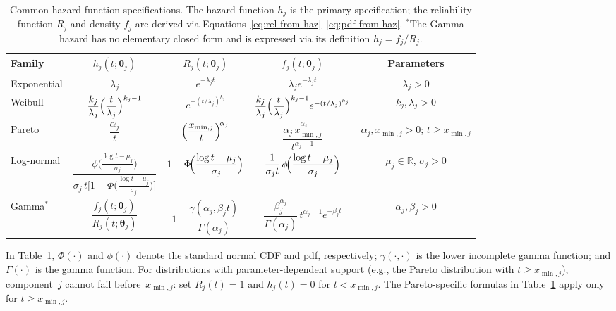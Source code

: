 \documentclass[11pt]{article}
\theoremstyle{definition}
\theoremstyle{plain}
\renewcommand{\v}[1]{\boldsymbol{#1}}
\begin{document}
\begin{table}[ht]
\centering
\caption{Common hazard function specifications.
The hazard function $h_j$ is the primary specification; the reliability
function $R_j$ and density $f_j$ are derived via
Equations~\eqref{eq:rel-from-haz}--\eqref{eq:pdf-from-haz}.
$^*$The Gamma hazard has no elementary closed form and is expressed
via its definition $h_j = f_j / R_j$.}
\label{tab:distributions}
\footnotesize
\renewcommand{\arraystretch}{1.6}
\begin{tabular}{@{}lcccc@{}}
\toprule
\textbf{Family} & $h_j(t; \v{\theta}_j)$ & $R_j(t; \v{\theta}_j)$
    & $f_j(t; \v{\theta}_j)$ & \textbf{Parameters} \\
\midrule
Exponential
    & $\lambda_j$
    & $e^{-\lambda_j t}$
    & $\lambda_j e^{-\lambda_j t}$
    & $\lambda_j > 0$ \\
Weibull
    & $\dfrac{k_j}{\lambda_j}\Bigl(\dfrac{t}{\lambda_j}\Bigr)^{k_j - 1}$
    & $e^{-(t/\lambda_j)^{k_j}}$
    & $\dfrac{k_j}{\lambda_j}\Bigl(\dfrac{t}{\lambda_j}\Bigr)^{k_j - 1}
        e^{-(t/\lambda_j)^{k_j}}$
    & $k_j, \lambda_j > 0$ \\
Pareto
    & $\dfrac{\alpha_j}{t}$
    & $\Bigl(\dfrac{x_{\min,j}}{t}\Bigr)^{\!\alpha_j}$
    & $\dfrac{\alpha_j \, x_{\min,j}^{\alpha_j}}{t^{\alpha_j + 1}}$
    & $\alpha_j, x_{\min,j} > 0$; $t \geq x_{\min,j}$ \\
Log-normal
    & $\dfrac{\phi\bigl(\frac{\log t - \mu_j}{\sigma_j}\bigr)}
        {\sigma_j \, t \bigl[1 - \Phi\bigl(\frac{\log t - \mu_j}{\sigma_j}\bigr)\bigr]}$
    & $1 - \Phi\!\Bigl(\dfrac{\log t - \mu_j}{\sigma_j}\Bigr)$
    & $\dfrac{1}{\sigma_j t}\,
        \phi\!\Bigl(\dfrac{\log t - \mu_j}{\sigma_j}\Bigr)$
    & $\mu_j \in \mathbb{R}$, $\sigma_j > 0$ \\
Gamma$^*$
    & $\dfrac{f_j(t; \v{\theta}_j)}{R_j(t; \v{\theta}_j)}$
    & $1 - \dfrac{\gamma(\alpha_j, \beta_j t)}{\Gamma(\alpha_j)}$
    & $\dfrac{\beta_j^{\alpha_j}}{\Gamma(\alpha_j)} \,
        t^{\alpha_j - 1} e^{-\beta_j t}$
    & $\alpha_j, \beta_j > 0$ \\
\bottomrule
\end{tabular}
\end{table}

In Table~\ref{tab:distributions}, $\Phi(\cdot)$ and $\phi(\cdot)$ denote
the standard normal CDF and pdf, respectively; $\gamma(\cdot, \cdot)$ is the
lower incomplete gamma function; and $\Gamma(\cdot)$ is the gamma function.
For distributions with parameter-dependent support (e.g., the Pareto
distribution with $t \geq x_{\min,j}$), component~$j$ cannot fail
before~$x_{\min,j}$: set $R_j(t) = 1$ and $h_j(t) = 0$ for
$t < x_{\min,j}$.
The Pareto-specific formulas in Table~\ref{tab:distributions} apply only
for $t \geq x_{\min,j}$.
\end{document}
